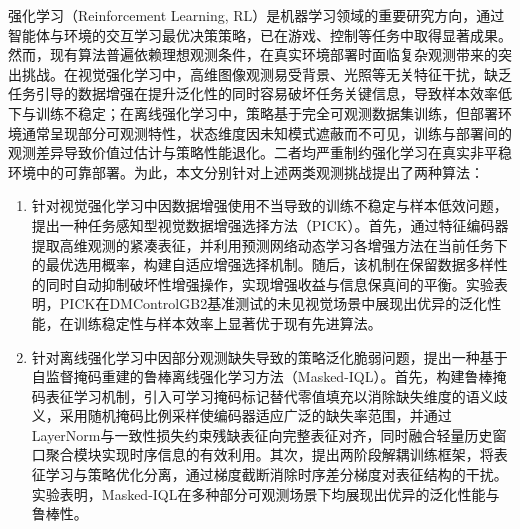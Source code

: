 \begin{chineseabstract}

强化学习（Reinforcement Learning, RL）是机器学习领域的重要研究方向，通过智能体与环境的交互学习最优决策策略，已在游戏、控制等任务中取得显著成果。然而，现有算法普遍依赖理想观测条件，在真实环境部署时面临复杂观测带来的突出挑战。在视觉强化学习中，高维图像观测易受背景、光照等无关特征干扰，缺乏任务引导的数据增强在提升泛化性的同时容易破坏任务关键信息，导致样本效率低下与训练不稳定；在离线强化学习中，策略基于完全可观测数据集训练，但部署环境通常呈现部分可观测特性，状态维度因未知模式遮蔽而不可见，训练与部署间的观测差异导致价值过估计与策略性能退化。二者均严重制约强化学习在真实非平稳环境中的可靠部署。为此，本文分别针对上述两类观测挑战提出了两种算法：
\begin{enumerate}[label=\arabic*）]
    \item 针对视觉强化学习中因数据增强使用不当导致的训练不稳定与样本低效问题，提出一种任务感知型视觉数据增强选择方法（PICK）。首先，通过特征编码器提取高维观测的紧凑表征，并利用预测网络动态学习各增强方法在当前任务下的最优选用概率，构建自适应增强选择机制。随后，该机制在保留数据多样性的同时自动抑制破坏性增强操作，实现增强收益与信息保真间的平衡。实验表明，PICK在DMControlGB2基准测试的未见视觉场景中展现出优异的泛化性能，在训练稳定性与样本效率上显著优于现有先进算法。
    \item 针对离线强化学习中因部分观测缺失导致的策略泛化脆弱问题，提出一种基于自监督掩码重建的鲁棒离线强化学习方法（Masked-IQL）。首先，构建鲁棒掩码表征学习机制，引入可学习掩码标记替代零值填充以消除缺失维度的语义歧义，采用随机掩码比例采样使编码器适应广泛的缺失率范围，并通过LayerNorm与一致性损失约束残缺表征向完整表征对齐，同时融合轻量历史窗口聚合模块实现时序信息的有效利用。其次，提出两阶段解耦训练框架，将表征学习与策略优化分离，通过梯度截断消除时序差分梯度对表征结构的干扰。实验表明，Masked-IQL在多种部分可观测场景下均展现出优异的泛化性能与鲁棒性。
\end{enumerate}




\end{chineseabstract}